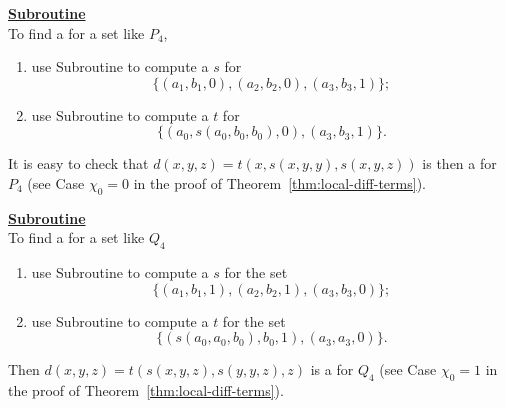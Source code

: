  \medskip

  \noindent \underline{\textbf{Subroutine }}\\[4pt]
  To find a \ldto for a set like $P_4$,
  \begin{enumerate}
  \item use Subroutine  to compute a \ldto $s$ for
  \begin{equation*}
  \{(a_1, b_1, 0),  (a_2, b_2, 0),  (a_3, b_3, 1)\};
  \end{equation*}
  \item use Subroutine  to compute a \ldto $t$ for
  \begin{equation*}
  \{(a_0, s(a_0, b_0, b_0), 0), (a_3, b_3, 1)\}.
  \end{equation*}
  \end{enumerate}
  It is easy to check that
  $d(x,y,z) = t(x, s(x,y,y), s(x,y,z))$
  is then a \ldto for $P_4$
  (see Case $\chi_0=0$ in the proof of Theorem~\ref{thm:local-diff-terms}).

  \medskip

  \noindent \underline{\textbf{Subroutine }}\\[4pt]
  To find a \ldto for a set like $Q_4$
  \begin{enumerate}
  \item
  use Subroutine  to compute a \ldto $s$ for the set
  \begin{equation*}
  \{(a_1, b_1, 1), (a_2, b_2, 1), (a_3, b_3, 0)\};
  \end{equation*}
  \item  use Subroutine  to compute a \ldto $t$
  for the set
  \begin{equation*}
  \{(s(a_0, a_0, b_0), b_0, 1),  (a_3,a_3,0)\}.
  \end{equation*}
  \end{enumerate}
  Then
  $d(x,y,z) = t(s(x,y,z), s(y,y,z),z)$
  is a \ldto  for $Q_4$ (see Case $\chi_0=1$ in the proof of Theorem~\ref{thm:local-diff-terms}).


  \medskip

